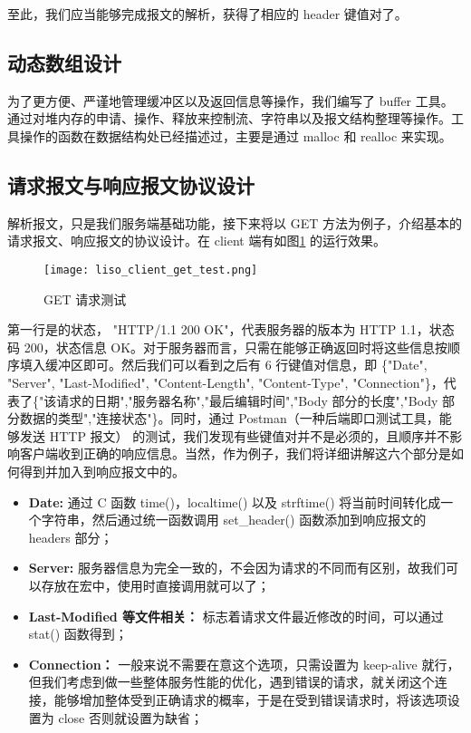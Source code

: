 至此，我们应当能够完成报文的解析，获得了相应的 header 键值对了。

\subsection{动态数组设计}

为了更方便、严谨地管理缓冲区以及返回信息等操作，我们编写了 buffer 工具。通过对堆内存的申请、操作、释放来控制流、字符串以及报文结构整理等操作。工具操作的函数在数据结构处已经描述过，主要是通过 malloc 和 realloc 来实现。

\subsection{请求报文与响应报文协议设计}

解析报文，只是我们服务端基础功能，接下来将以 GET 方法为例子，介绍基本的请求报文、响应报文的协议设计。在 client 端有如图\ref{fig:liso_client_get_test} 的运行效果。

\begin{figure}
  \centering
  \texttt{[image: liso\_client\_get\_test.png]}
  \caption{GET 请求测试}\label{fig:liso_client_get_test}
\end{figure}

第一行是的状态， "HTTP/1.1 200 OK"，代表服务器的版本为 HTTP 1.1，状态码 200，状态信息 OK。对于服务器而言，只需在能够正确返回时将这些信息按顺序填入缓冲区即可。然后我们可以看到之后有 6 行键值对信息，即 \{"Date", "Server", "Last-Modified", "Content-Length", "Content-Type", "Connection"\}，代表了\{"该请求的日期","服务器名称","最后编辑时间","Body 部分的长度","Body 部分数据的类型","连接状态"\}。同时，通过 Postman（一种后端即口测试工具，能够发送 HTTP 报文） 的测试，我们发现有些键值对并不是必须的，且顺序并不影响客户端收到正确的响应信息。当然，作为例子，我们将详细讲解这六个部分是如何得到并加入到响应报文中的。

\begin{itemize}
  \item \textbf{Date: } 通过 C 函数 time()，localtime() 以及 strftime() 将当前时间转化成一个字符串，然后通过统一函数调用 set\_header() 函数添加到响应报文的 headers 部分；
  \item \textbf{Server: } 服务器信息为完全一致的，不会因为请求的不同而有区别，故我们可以存放在宏中，使用时直接调用就可以了；
  \item \textbf{Last-Modified 等文件相关： } 标志着请求文件最近修改的时间，可以通过 stat() 函数得到；
  \item \textbf{Connection： } 一般来说不需要在意这个选项，只需设置为 keep-alive 就行，但我们考虑到做一些整体服务性能的优化，遇到错误的请求，就关闭这个连接，能够增加整体受到正确请求的概率，于是在受到错误请求时，将该选项设置为 close 否则就设置为缺省；
\end{itemize}

